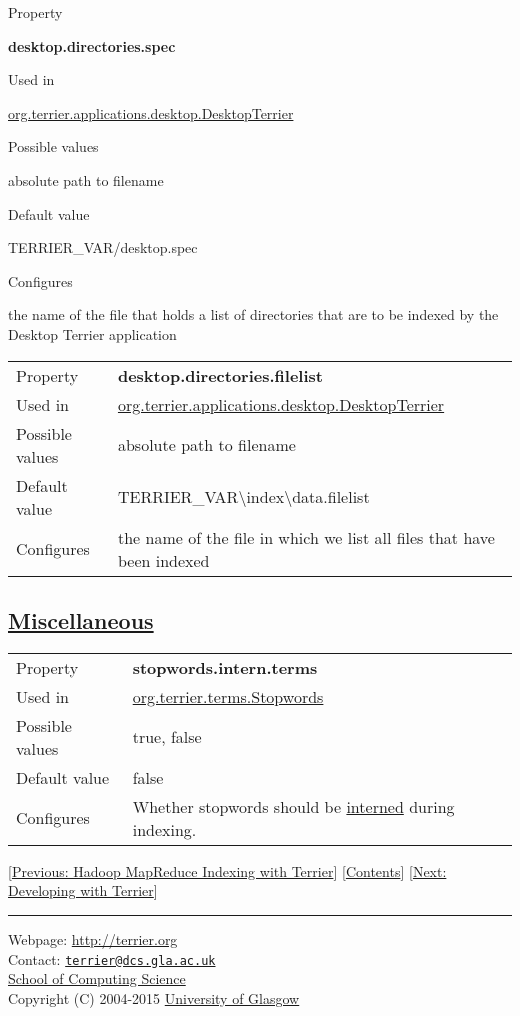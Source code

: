 Property

\textbf{desktop.directories.spec}

Used in

\href{javadoc/org/terrier/applications/desktop/DesktopTerrier.html}{org.terrier.applications.desktop.DesktopTerrier}

Possible values

absolute path to filename

Default value

TERRIER\_VAR/desktop.spec

Configures

the name of the file that holds a list of directories that are to be
indexed by the Desktop Terrier application

\begin{longtable}[]{@{}ll@{}}
\toprule
Property & \textbf{desktop.directories.filelist}\tabularnewline
Used in &
\href{javadoc/org/terrier/applications/desktop/DesktopTerrier.html}{org.terrier.applications.desktop.DesktopTerrier}\tabularnewline
Possible values & absolute path to filename\tabularnewline
Default value &
TERRIER\_VAR\textbackslash{}index\textbackslash{}data.filelist\tabularnewline
Configures & the name of the file in which we list all files that have
been indexed\tabularnewline
\bottomrule
\end{longtable}

\subsection{\texorpdfstring{\href{}{Miscellaneous}}{Miscellaneous}}\label{miscellaneous}

\begin{longtable}[]{@{}ll@{}}
\toprule
Property & \textbf{stopwords.intern.terms}\tabularnewline
Used in &
\href{javadoc/org/terrier/terms/Stopwords.html}{org.terrier.terms.Stopwords}\tabularnewline
Possible values & true, false\tabularnewline
Default value & false\tabularnewline
Configures & Whether stopwords should be
\href{http://java.sun.com/j2se/1.5.0/docs/api/java/lang/String.html\#intern()}{interned}
during indexing.\tabularnewline
\bottomrule
\end{longtable}

{[}\href{hadoop_indexing.html}{Previous: Hadoop MapReduce Indexing with
Terrier}{]} {[}\href{index.html}{Contents}{]}
{[}\href{terrier_develop.html}{Next: Developing with Terrier}{]}

\begin{center}\rule{0.5\linewidth}{\linethickness}\end{center}

Webpage: \url{http://terrier.org}\\
Contact:
\href{mailto:terrier@dcs.gla.ac.uk}{\nolinkurl{terrier@dcs.gla.ac.uk}}\\
\href{http://www.dcs.gla.ac.uk/}{School of Computing Science}\\
Copyright (C) 2004-2015 \href{http://www.gla.ac.uk/}{University of
Glasgow}
